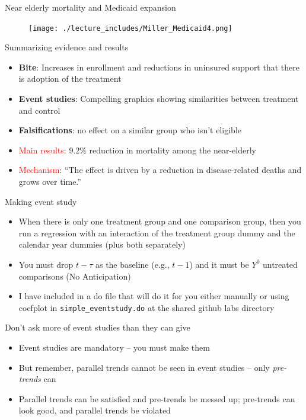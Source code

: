 \documentclass{beamer}
\begin{document}
\begin{frame}{Near elderly mortality and Medicaid expansion}

	\begin{figure}
	\texttt{[image: ./lecture\_includes/Miller\_Medicaid4.png]}
	\end{figure}

\end{frame}

\begin{frame}{Summarizing evidence and results}

\begin{itemize}
\item \textbf{Bite}: Increases in enrollment and reductions in uninsured support that there is adoption of the treatment
\item \textbf{Event studies}: Compelling graphics showing similarities between treatment and control
\item \textbf{Falsifications}: no effect on a similar group who isn't eligible
\item \textcolor{red}{Main results}: 9.2\% reduction in mortality among the near-elderly
\item \textcolor{red}{Mechanism}: ``The effect is driven by a reduction in disease-related deaths and grows over time.''
\end{itemize}

\end{frame}

\begin{frame}{Making event study}

\begin{itemize}
\item When there is only one treatment group and one comparison group, then you run a regression with an interaction of the treatment group dummy and the calendar year dummies (plus both separately)
\item You must drop $t-\tau$ as the baseline (e.g., $t-1$) and it must be $Y^0$ untreated comparisons (No Anticipation)
\item I have included in a do file that will do it for you either manually or using coefplot in \texttt{simple\_eventstudy.do} at the shared github labs directory
\end{itemize}

\end{frame}





\begin{frame}{Don't ask more of event studies than they can give}

\begin{itemize}
\item Event studies are mandatory -- you must make them
\item But remember, parallel trends cannot be seen in event studies -- only \emph{pre-trends} can
\item Parallel trends can be satisfied and pre-trends be messed up; pre-trends can look good, and parallel trends be violated

\end{itemize}
\end{frame}
\end{document}

